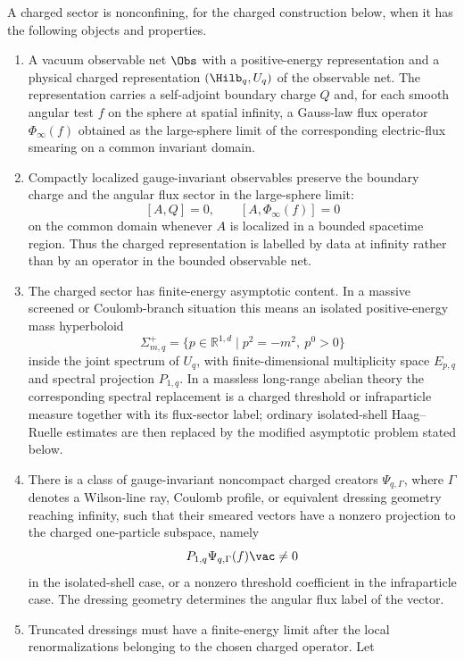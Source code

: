 \begin{hypothesis}
\label{hyp:nonconfining-charged-sector-datum}
A charged sector is nonconfining, for the charged construction below, when it
has the following objects and properties.
\begin{enumerate}
\item A vacuum observable net \(\Obs\) with a positive-energy representation
and a physical charged representation \((\Hilb_q,U_q)\) of the observable net.
The representation carries a self-adjoint boundary charge \(Q\) and, for each
smooth angular test \(f\) on the sphere at spatial infinity, a Gauss-law flux
operator \(\Phi_\infty(f)\) obtained as the large-sphere limit of the
corresponding electric-flux smearing on a common invariant domain.
\item Compactly localized gauge-invariant observables preserve the boundary
charge and the angular flux sector in the large-sphere limit:
\[
  [A,Q]=0,\qquad [A,\Phi_\infty(f)]=0
\]
on the common domain whenever \(A\) is localized in a bounded spacetime
region.  Thus the charged representation is labelled by data at infinity
rather than by an operator in the bounded observable net.
\item The charged sector has finite-energy asymptotic content.  In a massive
screened or Coulomb-branch situation this means an isolated positive-energy
mass hyperboloid
\[
  \Sigma_{m,q}^+
  =
  \{p\in\mathbb R^{1,d}\mid p^2=-m^2,\ p^0>0\}
\]
inside the joint spectrum of \(U_q\), with finite-dimensional multiplicity
space \(E_{p,q}\) and spectral projection \(P_{1,q}\).  In a massless
long-range abelian theory the corresponding spectral replacement is a charged
threshold or infraparticle measure together with its flux-sector label; ordinary
isolated-shell Haag--Ruelle estimates are then replaced by the modified
asymptotic problem stated below.
\item There is a class of gauge-invariant noncompact charged creators
\(\Psi_{q,\Gamma}\), where \(\Gamma\) denotes a Wilson-line ray, Coulomb
profile, or equivalent dressing geometry reaching infinity, such that their
smeared vectors have a nonzero projection to the charged one-particle
subspace, namely
\[
  P_{1,q}\Psi_{q,\Gamma}(f)\vac\ne0
\]
in the isolated-shell case, or a nonzero threshold coefficient in the
infraparticle case.  The dressing geometry determines the angular flux label
of the vector.
\item Truncated dressings must have a finite-energy limit after the local
renormalizations belonging to the chosen charged operator.  Let

\end{enumerate}
\end{hypothesis}
